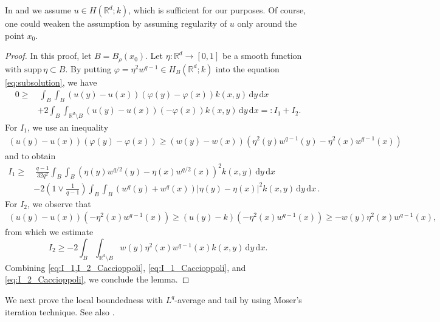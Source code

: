 \documentclass[reqno]{amsart}
\theoremstyle{plain}
\theoremstyle{definition}
\numberwithin{equation}{section}
\newcommand{\Rd}{\mathbb{R}^d}
\newcommand{\dx} {\, \mathrm{d}x}
\newcommand{\dy} {\, \mathrm{d}y}
\begin{document}
In  and  we assume $u \in H(\Rd; k)$, which is sufficient for our purposes. Of course, one could weaken the assumption by assuming regularity of $u$ only around the point $x_0$.

\begin{proof}
In this proof, let $B = B_\rho(x_0)$. Let $\eta : \Rd \rightarrow [0,1]$
be a smooth function with $\mathrm{supp} \, \eta \subset B$. By putting $\varphi = \eta^{2} w^{q-1} \in H_{B}(\Rd; k)$ into the equation \eqref{eq:subsolution}, we have
\begin{equation} \label{eq:I_1,I_2_Caccioppoli}
\begin{split}
0 \geq&~ \int_B \int_B (u(y) - u(x))(\varphi(y) - \varphi(x)) k(x,y) \dy \dx \\
&+ 2 \int_B \int_{\Rd \setminus B} (u(y) - u(x))(-\varphi(x)) k(x,y) \dy \dx
=: I_1 + I_2.
\end{split}
\end{equation}
For $I_1$, we use an inequality
\begin{align*}
(u(y) - u(x))(\varphi(y) - \varphi(x))
\geq (w(y) - w(x)) \left( \eta^2 (y) w^{q-1}(y) - \eta^2(x) w^{q-1}(x) \right)
\end{align*}
and  to obtain
\begin{equation} \label{eq:I_1_Caccioppoli}
\begin{split}
I_1 
\geq&~ \frac{q-1}{32q^2} \int_B \int_B \left( \eta(y) 
w^{q/2}(y) - \eta(x) w^{q/2}(x) \right)^2 k(x,y) \dy \dx \\
&- 2 \left( 1 \lor \frac{1}{q-1} \right) \int_B \int_B 
(w^q(y) + w^q(x)) |\eta(y) - \eta(x)|^2 k(x,y) \dy \dx \,.
\end{split}
\end{equation}
For $I_2$, we observe that
\begin{align*}
(u(y) - u(x)) (-\eta^2(x) w^{q-1}(x)) \geq (u(y) - k)(-\eta^2(x) w^{q-1}(x)) 
\geq -w(y) \eta^2(x) w^{q-1}(x),
\end{align*}
from which we estimate
\begin{equation} \label{eq:I_2_Caccioppoli}
I_2 \geq - 2 \int_B \int_{\Rd \setminus B} w(y) \eta^2(x) w^{q-1}(x) k(x,y) \dy \dx.
\end{equation}
Combining \eqref{eq:I_1,I_2_Caccioppoli}, \eqref{eq:I_1_Caccioppoli}, and
\eqref{eq:I_2_Caccioppoli}, we conclude the lemma.
\end{proof}

We next prove the local boundedness with $L^q$-average and tail by using Moser's iteration technique. See also \cite{DCKP16, Coz17, Sch20}.
\end{document}
